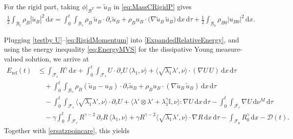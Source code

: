 \documentclass[11pt,twoside,reqno]{amsart}
\numberwithin{equation}{section}
\numberwithin{figure}{section}
\begin{document}
For the rigid part, taking \(\phi|_{\mathcal{B}^T}=\tilde u_B\) in \eqref{eq:MassCRigidP} gives
\begin{equation}\label{eq:RigidMomentum}
\begin{aligned}
    \frac{1}{2}\int_{\mathcal{B}_t}\rho_B|\tilde u_B|^2\,\mathrm{d}x
=\int_0^t\!\!\int_{\mathcal{B}_\tau}\rho_B\,\tilde u_B\cdot \partial_\tau \tilde u_B
+\rho_B u_B\cdot\big(\nabla\tilde u_B\,\tilde u_B\big)\,\mathrm{d}x\,\mathrm{d}\tau
+\frac{1}{2}\int_{\mathcal{B}_0}\rho_{B0}|u_{B0}|^2\,\mathrm{d}x.
\end{aligned}
\end{equation}

Plugging \eqref{testby U}--\eqref{eq:RigidMomentum} into \eqref{ExpandedRelativeEnergy}, and using the energy inequality \eqref{eq:EnergyMVS} for the dissipative Young measure-valued solution, we arrive at
\begin{equation}\label{SimplifiedErel}
\begin{aligned}
E_{\mathrm{rel}}(t)
&\le \int_{\mathcal{F}_t}R^\gamma\,\mathrm{d}x
+\int_0^t\!\!\int_{\mathcal{F}_\tau} U\cdot \partial_\tau U\,\langle \lambda_1,\nu\rangle
+\Big\langle \sqrt{\lambda_1}\lambda',\nu\Big\rangle\!\cdot(\nabla U\,U)\,\mathrm{d}x\,\mathrm{d}\tau\\
&\quad+\int_0^t\!\!\int_{\mathcal{B}_\tau}\rho_B(\tilde u_B-u_B)\cdot \partial_\tau \tilde u_B
+\rho_B u_B\cdot(\nabla\tilde u_B\,\tilde u_B)\,\mathrm{d}x\,\mathrm{d}\tau\\
&\quad-\int_0^t\!\!\int_{\mathcal{F}_\tau}\Big\langle \sqrt{\lambda_1}\lambda',\nu\Big\rangle\!\cdot \partial_\tau U
+\Big\langle \lambda'\!\otimes\!\lambda'+\lambda_1^\gamma\mathbb{I},\nu\Big\rangle\!:\!\nabla U\,\mathrm{d}x\,\mathrm{d}\tau
-\int_0^t\!\!\int_{\overline{\mathcal{F}_\tau}}\nabla U\,\mathrm{d}\nu^M\,\mathrm{d}\tau\\
&\quad-\gamma\int_0^t\!\!\int_{\mathcal{F}_\tau} R^{\gamma-2}\,\partial_\tau R\,\langle \lambda_1,\nu\rangle
+\gamma R^{\gamma-2}\Big\langle \sqrt{\lambda_1}\lambda',\nu\Big\rangle\!\cdot\nabla R\,\mathrm{d}x\,\mathrm{d}\tau
-\int_{\mathcal{F}_0}R_0^\gamma\,\mathrm{d}x-\mathcal{D}(t).
\end{aligned}
\end{equation}
Together with \eqref{ersatzpoincare}, this yields
\end{document}
